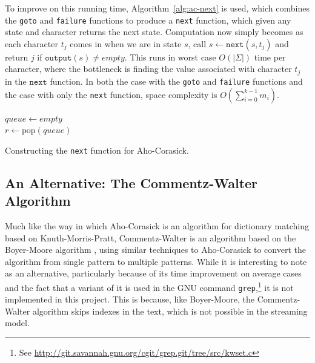 \documentclass[ %
                    author={Dominic Joseph Moylett},
                    degree={MEng},
                     title={Dictionary Matching with Fingerprints},
                  subtitle={An Empirical Analysis},
                      type={research},
                      year={2015} ]{dissertation}
\begin{document}
To improve on this running time, Algorithm~\ref{alg:ac-next} is used, which combines the \texttt{goto} and \texttt{failure} functions to produce a \texttt{next} function, which given any state and character returns the next state. Computation now simply becomes as each character $t_j$ comes in when we are in state $s$, call $s \gets \texttt{next}(s, t_j)$ and return $j$ if $\texttt{output}(s) \neq empty$. This runs in worst case $O(|\Sigma|)$ time per character, where the bottleneck is finding the value associated with character $t_j$ in the $\texttt{next}$ function. In both the case with the \texttt{goto} and \texttt{failure} functions and the case with only the \texttt{next} function, space complexity is $O(\sum_{i=0}^{k-1}m_i)$.

\begin{algorithm}[t]
$queue \gets empty$\\
 {
  $r \gets \text{pop}(queue)$\\
}
\caption{Constructing the \texttt{next} function for Aho-Corasick.}
\label{alg:ac-next}
\end{algorithm}

\subsection{An Alternative: The Commentz-Walter Algorithm}

Much like the way in which Aho-Corasick is an algorithm for dictionary matching based on Knuth-Morris-Pratt, Commentz-Walter \cite{commentz-walter:algo} is an algorithm based on the Boyer-Moore algorithm \cite{Boyer:1977:FSS:359842.359859}, using similar techniques to Aho-Corasick to convert the algorithm from single pattern to multiple patterns. While it is interesting to note as an alternative, particularly because of its time improvement on average cases and the fact that a variant of it is used in the GNU command \texttt{grep},\footnote{See \url{http://git.savannah.gnu.org/cgit/grep.git/tree/src/kwset.c}} it is not implemented in this project. This is because, like Boyer-Moore, the Commentz-Walter algorithm skips indexes in the text, which is not possible in the streaming model.
\end{document}
